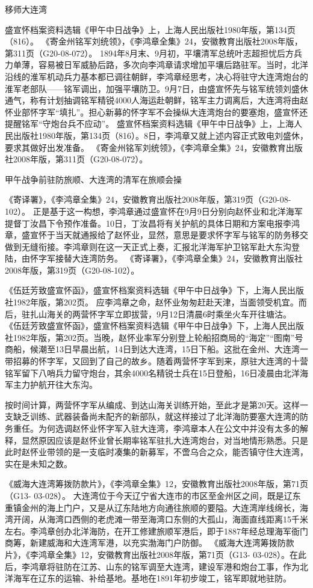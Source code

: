 \documentclass[12pt,UTF8]{ctexbook}
\begin{document}
移师大连湾

盛宣怀档案资料选辑《甲午中日战争》上，上海人民出版社1980年版，第134页（816）。
《寄金州铭军刘统领》，《李鸿章全集》24，安徽教育出版社2008年版，第311页（G20-08-072）。
1894年8月末、9月初，平壤清军总统叶志超担忧后方兵力单薄，容易被日军威胁后路，多次向李鸿章请求增加平壤后路驻军。当时，北洋沿线的淮军机动兵力基本都已调往朝鲜，李鸿章经思考，决心将驻守大连湾炮台的淮军老部队——铭军调出，加强平壤防卫。9月7日，由盛宣怀先与铭军统领刘盛休通气，称有计划抽调铭军精锐4000人海运赴朝鲜，铭军主力调离后，大连湾将由赵怀业部怀字军“填扎”。担心新募的怀字军不会操纵大连湾炮台的要塞炮，盛宣怀还提醒铭军“守炮台兵不应动”。 盛宣怀档案资料选辑《甲午中日战争》上，上海人民出版社1980年版，第134页（816）。8日，李鸿章又就上述内容正式致电刘盛休，要求其做好出发准备。 《寄金州铭军刘统领》，《李鸿章全集》24，安徽教育出版社2008年版，第311页（G20-08-072）。


甲午战争前驻防旅顺、大连湾的清军在旅顺会操

《寄译署》，《李鸿章全集》24，安徽教育出版社2008年版，第319页（G20-08-102）。
正是基于这一构想，李鸿章通过盛宣怀在9月9日分别向赵怀业和北洋海军提督丁汝昌下令预作准备。10日，丁汝昌将有关护航的具体日期和方案电报李鸿章，盛宣怀于当天就通报给了赵怀业，显然，意思是要求怀字军与铭军的防务移交做到无缝衔接。李鸿章则在这一天正式上奏，汇报北洋海军护卫铭军赴大东沟登陆，由怀字军接替大连湾防务。 《寄译署》，《李鸿章全集》24，安徽教育出版社2008年版，第319页（G20-08-102）。

《伍廷芳致盛宣怀函》，盛宣怀档案资料选辑《甲午中日战争》下，上海人民出版社1982年版，第202页。
应李鸿章之命，赵怀业匆匆赶赴天津，当面领受机宜。而后，驻扎山海关的两营怀字军立即拔营，9月12日清晨6时乘坐火车开往塘沽。 《伍廷芳致盛宣怀函》，盛宣怀档案资料选辑《甲午中日战争》下，上海人民出版社1982年版，第202页。当晚，赵怀业率军分别登上轮船招商局的“海定”“图南”号商船，候潮至13日早晨出航，14日到达大连湾，15日下船。这批在金州、大连湾一带招募的怀字军，又回到了自己的故乡。随着两营怀字军到来，原驻大连湾的十营铭军留下八哨兵力留守炮台，其余4000名精锐士兵在15日登船，16日凌晨由北洋海军主力护航开往大东沟。

按时间计算，两营怀字军从编成、到达山海关训练开始，至此才是第20天。这样一支缺乏训练、武器装备尚未配齐的新部队，就这样接过了北洋海防要塞大连湾的防务重任。为何选调赵怀业怀字军入驻大连湾，李鸿章本人在公文中并没有太多的解释，显然原因应该是赵怀业曾长期率铭军驻扎大连湾炮台，对当地情形熟悉。只是此时赵怀业带领的是一支临时凑集的新募军，不啻乌合之众，能否镇守住大连湾，实在是未知之数。

《威海大连湾筹拨防款片》，《李鸿章全集》12，安徽教育出版社2008年版，第71页（G13- 03-028）。
大连湾位于今天辽宁省大连市的市区至金州区之间，既是辽东重镇金州的海上门户，又是从辽东陆地方向通往旅顺的要隘。大连湾岸线绵长，海湾开阔，从海湾口西侧的老虎滩一带至海湾口东侧的大孤山，海面直线距离15千米左右。李鸿章创办北洋海防，在开工修建旅顺军港后，即于1887年经总理海军衙门商筹，新建威海和大连湾军港，以充实渤海门户防御。 《威海大连湾筹拨防款片》，《李鸿章全集》12，安徽教育出版社2008年版，第71页（G13- 03-028）。在此后，李鸿章将驻防在江苏、山东的铭军调至大连湾，建设军港和炮台工事，作为北洋海军在辽东的运输、补给基地。基地在1891年初步竣工，铭军即就地驻防。
\end{document}

